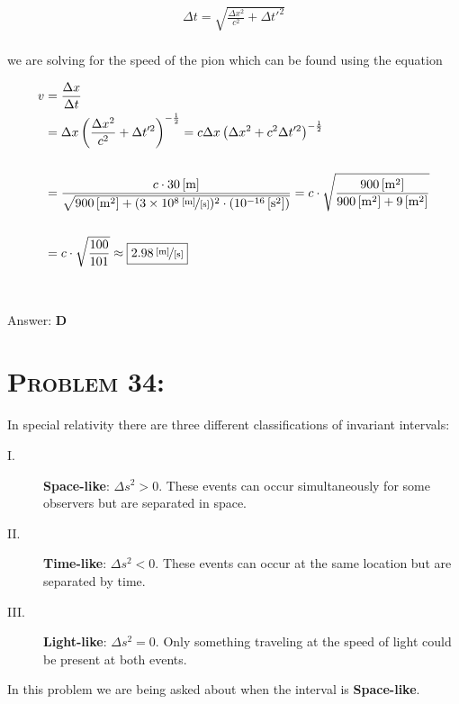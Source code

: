 \documentclass{article}
\providecommand{\e}[1]{\ensuremath{\times 10^{#1}}}
\begin{document}
\begin{gather}
\Delta t = \sqrt{\frac{\Delta x^{2}}{c^{2}} + \Delta t'^{2}}\nonumber
\end{gather}
\\
we are solving for the speed of the pion which can be found using the equation

\begin{align}
v &= \frac{\Delta x}{\Delta t}\\
&= \Delta x \left(   \frac{\Delta x^{2}}{c^{2}} + \Delta t'^{2}   \right)^{-\frac{1}{2}} = c \Delta x \left(   \Delta x^{2} + c^{2}\Delta t'^{2}   \right)^{-\frac{1}{2}}\nonumber\\
\nonumber\\
&= \frac{c \cdot \unit[30]{[m]}}{\sqrt{\unit[900]{[m^{2}]} + (\unitfrac[3\e{8}]{[m]}{[s]})^{2} \cdot (\unit[10^{-16}]{[s^{2}]})}} = c \cdot\sqrt{    \frac{\unit[900]{[m^{2}]}}{\unit[900]{[m^{2}]} + \unit[9]{[m^{2}]} }     }\nonumber\\
\nonumber\\
 &= c \cdot \sqrt{\frac{100}{101}} \approx \boxed{\unitfrac[2.98]{[m]}{[s]}}\nonumber
\end{align}
\\\\
Answer: \textbf{\textcolor{ProcessBlue}D}\\


\section{\textsc{Problem 34:}} In special relativity there are three different classifications of invariant intervals:

\begin{description}
\item[I.] \textbf{Space-like}: $\Delta s^{2} > 0$.  These events can occur simultaneously for some observers but are separated in space.

\item[II.] \textbf{Time-like}: $\Delta s^{2} < 0$. These events can occur at the same location but are separated by time.

\item[III.] \textbf{Light-like}: $\Delta s^{2} = 0$. Only something traveling at the speed of light could be present at both events.
\end{description}
In this problem we are being asked about when the interval is \textbf{Space-like}.
\end{document}
